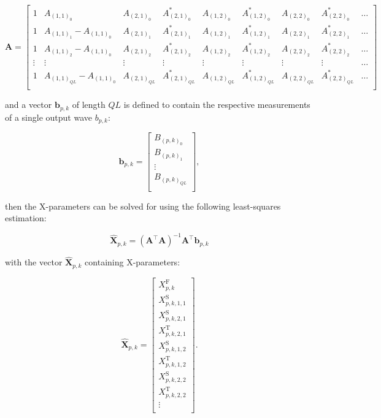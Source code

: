 \documentclass[../thesis/thesis.tex]{subfiles}
\begin{document}
\begin{refsection}
\begin{equation}
	\bm{A} =
	\begin{bmatrix}
		1 & A_{(1,1)_0} & A_{(2,1)_0} & A^*_{(2,1)_0} & A_{(1,2)_0} & A^*_{(1,2)_0} & A_{(2,2)_0} & A^*_{(2,2)_0} & \dots \\
		1 & A_{(1,1)_1} - A_{(1,1)_0} & A_{(2,1)_1} & A^*_{(2,1)_1} & A_{(1,2)_1} & A^*_{(1,2)_1} & A_{(2,2)_1} & A^*_{(2,2)_1} & \dots \\
		1 & A_{(1,1)_2} - A_{(1,1)_0} & A_{(2,1)_2} & A^*_{(2,1)_2} & A_{(1,2)_2} & A^*_{(1,2)_2} & A_{(2,2)_2} & A^*_{(2,2)_2} & \dots \\
		\vdots & \vdots & \vdots & \vdots & \vdots & \vdots & \vdots & \vdots & \dots \\
		1 & A_{(1,1)_{QL}} - A_{(1,1)_0} & A_{(2,1)_{QL}} & A^*_{(2,1)_{QL}} & A_{(1,2)_{QL}} & A^*_{(1,2)_{QL}} & A_{(2,2)_{QL}} & A^*_{(2,2)_{QL}} & \dots \\
	\end{bmatrix}
\end{equation}

and a vector $\bm{b}_{p,k}$ of length $QL$ is defined to contain the respective measurements of a single output wave $b_{p,k}$:

\begin{equation}
	\bm{b}_{p,k} =
	\begin{bmatrix}
		B_{(p,k)_0} \\
		B_{(p,k)_1} \\
		\vdots \\
		B_{(p,k)_{QL}} \\
	\end{bmatrix},
\end{equation}

then the X-parameters can be solved for using the following least-squares estimation:

\begin{equation}
	\bm{\hat{X}}_{p,k} = (\bm{A}^\top \bm{A})^{-1}\bm{A}^\top \bm{b}_{p,k}
\end{equation}

with the vector $\bm{\hat{X}}_{p,k}$ containing X-parameters:

\begin{equation}
	\bm{\hat{X}}_{p,k} = 
	\begin{bmatrix}
		X^\textrm{F}_{p,k} \\
		X^\textrm{S}_{p,k, 1, 1} \\
		X^\textrm{S}_{p,k, 2, 1} \\
		X^\textrm{T}_{p,k, 2, 1} \\
		X^\textrm{S}_{p,k, 1, 2} \\
		X^\textrm{T}_{p,k, 1, 2} \\
		X^\textrm{S}_{p,k, 2, 2} \\
		X^\textrm{T}_{p,k, 2, 2} \\
		\vdots \\
	\end{bmatrix}.
\end{equation}


\end{refsection}
\end{document}
